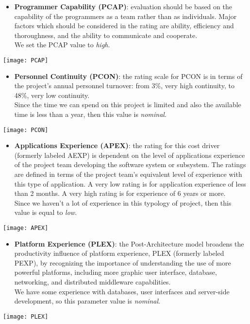 \begin{itemize}
	\item \textbf{Programmer Capability (PCAP)}: evaluation should be based on the capability of the programmers as a team rather than as individuals. Major factors which should be considered in the rating are ability, efficiency and thoroughness, and the ability to communicate and cooperate. \\ We set the PCAP value to \textit{high}.
\end{itemize}
\begin{center}
	\texttt{[image: PCAP]}
\end{center}	

\begin{itemize}
	\item \textbf{Personnel Continuity (PCON)}: the rating scale for PCON is in terms of the project’s annual personnel turnover: from 3\%, very high continuity, to 48\%, very low continuity. \\ Since the time we can spend on this project is limited and also the available time is less than a year, then this value is \textit{nominal}.
\end{itemize}
\begin{center}
	\texttt{[image: PCON]}
\end{center}

\begin{itemize}
	\item \textbf{Applications Experience (APEX)}: the rating for this cost driver (formerly labeled AEXP) is dependent on the level of applications experience of the project team developing the software system or subsystem. The ratings are defined in terms of the project team's equivalent level of experience with this type of application. A very low rating is for application experience of less than 2 months. A very high rating is for experience of 6 years or more. \\ Since we haven't a lot of experience in this typology of project, then this value is equal to \textit{low}.
\end{itemize}
\begin{center}
	\texttt{[image: APEX]}
\end{center}

\begin{itemize}
	\item \textbf{Platform Experience (PLEX)}: the Post-Architecture model broadens the productivity influence of platform experience, PLEX (formerly labeled PEXP), by recognizing the importance of understanding the use of more powerful platforms, including more graphic user interface, database, networking, and distributed middleware capabilities. \\ We have some experience with databases, user interfaces and server-side development, so this parameter value is \textit{nominal}. 
\end{itemize}
\begin{center}
	\texttt{[image: PLEX]}
\end{center}

